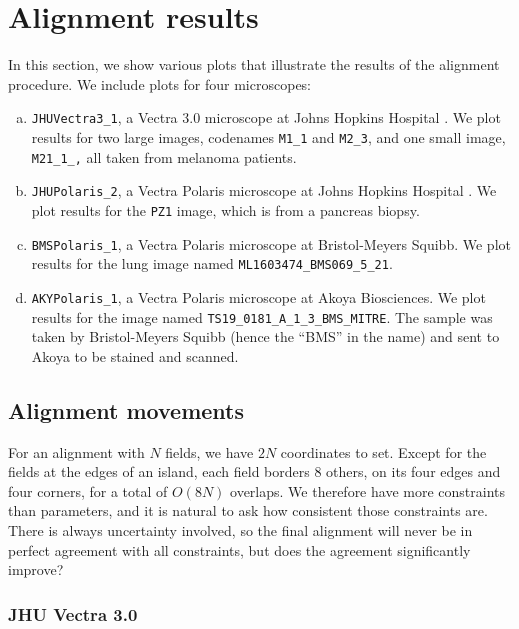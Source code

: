 \documentclass{article}
\newcommand{\M}[2]{\texttt{M#1\_#2}}
\begin{document}
\section{Alignment results}

In this section, we show various plots that illustrate the results of the alignment procedure.  We include plots for four microscopes:
\begin{enumerate}[(a)]
\item \texttt{JHUVectra3\_1}, a Vectra 3.0 microscope at Johns Hopkins Hospital \label{JHUVectra}.  We plot results for two large images, codenames \M11 and \M23, and one small image, \M{21\_1}, all taken from melanoma patients.
\item \texttt{JHUPolaris\_2}, a Vectra Polaris microscope at Johns Hopkins Hospital \label{JHUPolaris}.  We plot results for the \texttt{PZ1} image, which is from a pancreas biopsy.
\item \texttt{BMSPolaris\_1}, a Vectra Polaris microscope at Bristol-Meyers Squibb.  We plot results for the lung image named \texttt{ML1603474\_BMS069\_5\_21}.
\item \texttt{AKYPolaris\_1}, a Vectra Polaris microscope at Akoya Biosciences.  We plot results for the image named \texttt{TS19\_0181\_A\_1\_3\_BMS\_MITRE}.  The sample was taken by Bristol-Meyers Squibb (hence the ``BMS'' in the name) and sent to Akoya to be stained and scanned.
\end{enumerate}

\subsection{Alignment movements}

For an alignment with $N$ fields, we have $2N$ coordinates to set.  Except for the fields at the edges of an island, each field borders $8$ others, on its four edges and four corners, for a total of $O(8N)$ overlaps.  We therefore have more constraints than parameters, and it is natural to ask how consistent those constraints are.  There is always uncertainty involved, so the final alignment will never be in perfect agreement with all constraints, but does the agreement significantly improve?

\subsubsection{JHU Vectra 3.0}
\end{document}

